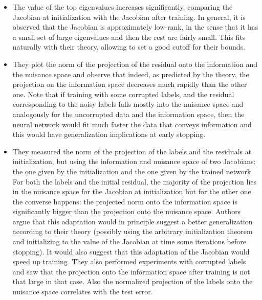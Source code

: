 \documentclass[a4paper]{article}
\begin{document}
\begin{itemize}
    \item The value of the top eigenvalues increases significantly, comparing the Jacobian at initialization with the Jacobian after training. In general, it is observed that the Jacobian is approximately low-rank, in the sense that it has a small set of large eigenvalues and then the rest are fairly small. This fits naturally with their theory, allowing to set a good cutoff for their bounds.
    \item They plot the norm of the projection of the residual onto the information and the nuisance space and observe that indeed, as predicted by the theory, the projection on the information space decreases much rapidly than the other one. Note that if training with some corrupted labels, and the residual corresponding to the noisy labels falls mostly into the nuisance space and analogously for the uncorrupted data and the information space, then the neural network would fit much faster the data that conveys information and this would have generalization implications at early stopping.
    \item They measured the norm of the projection of the labels and the residuals at initialization, but using the information and nuisance space of two Jacobians: the one given by the initialization and the one given by the trained network. For both the labels and the initial residual, the majority of the projection lies in the nuisance space for the Jacobian at initialization but for the other one the converse happens: the projected norm onto the information space is significantly bigger than the projection onto the nuisance space. Authors argue that this adaptation would in principle suggest a better generalization according to their theory (possibly using the arbitrary initialization theorem and initializing to the value of the Jacobian at time some iterations before stopping). It would also suggest that this adaptation of the Jacobian would speed up training.  They also performed experiments with corrupted labels and saw that the projection onto the information space after training is not that large in that case. Also the normalized projection of the labels onto the nuisance space correlates with the test error.
\end{itemize}

\nocite{*}                 %
\end{document}

